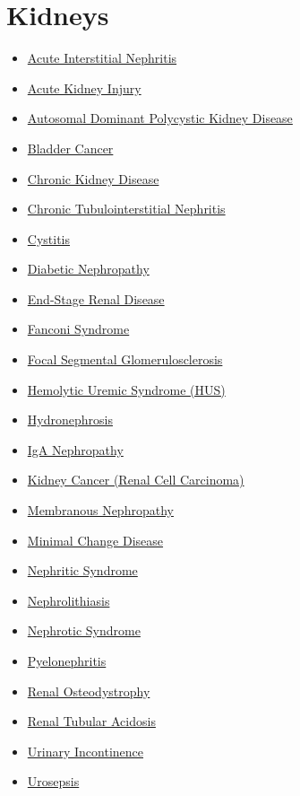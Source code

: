 \section*{Kidneys}
\label{sec:organ_kidneys}
\begin{itemize}[noitemsep]
  \item \hyperlink{sec:Acute Interstitial Nephritis}{Acute Interstitial Nephritis}
  \item \hyperlink{sec:Acute Kidney Injury}{Acute Kidney Injury}
  \item \hyperlink{sec:Autosomal Dominant Polycystic Kidney Disease}{Autosomal Dominant Polycystic Kidney Disease}
  \item \hyperlink{sec:Bladder Cancer}{Bladder Cancer}
  \item \hyperlink{sec:Chronic Kidney Disease}{Chronic Kidney Disease}
  \item \hyperlink{sec:Chronic Tubulointerstitial Nephritis}{Chronic Tubulointerstitial Nephritis}
  \item \hyperlink{sec:Cystitis}{Cystitis}
  \item \hyperlink{sec:Diabetic Nephropathy}{Diabetic Nephropathy}
  \item \hyperlink{sec:End-Stage Renal Disease}{End-Stage Renal Disease}
  \item \hyperlink{sec:Fanconi Syndrome}{Fanconi Syndrome}
  \item \hyperlink{sec:Focal Segmental Glomerulosclerosis}{Focal Segmental Glomerulosclerosis}
  \item \hyperlink{sec:Hemolytic Uremic Syndrome (HUS)}{Hemolytic Uremic Syndrome (HUS)}
  \item \hyperlink{sec:Hydronephrosis}{Hydronephrosis}
  \item \hyperlink{sec:IgA Nephropathy}{IgA Nephropathy}
  \item \hyperlink{sec:Kidney Cancer}{Kidney Cancer (Renal Cell Carcinoma)}
  \item \hyperlink{sec:Membranous Nephropathy}{Membranous Nephropathy}
  \item \hyperlink{sec:Minimal Change Disease}{Minimal Change Disease}
  \item \hyperlink{sec:Nephritic Syndrome}{Nephritic Syndrome}
  \item \hyperlink{sec:Nephrolithiasis}{Nephrolithiasis}
  \item \hyperlink{sec:Nephrotic Syndrome}{Nephrotic Syndrome}
  \item \hyperlink{sec:Pyelonephritis}{Pyelonephritis}
  \item \hyperlink{sec:Renal Osteodystrophy}{Renal Osteodystrophy}
  \item \hyperlink{sec:Renal Tubular Acidosis}{Renal Tubular Acidosis}
  \item \hyperlink{sec:Urinary Incontinence}{Urinary Incontinence}
  \item \hyperlink{sec:Urosepsis}{Urosepsis}
\end{itemize}

